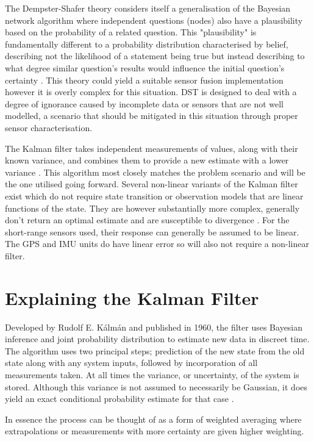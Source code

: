 	The Dempster-Shafer theory considers itself a generalisation of the Bayesian network algorithm where independent questions (nodes) also have a plausibility based on the probability of a related question. This "plausibility" is fundamentally different to a probability distribution characterised by belief, describing not the likelihood of a statement being true but instead describing to what degree similar question's results would influence the initial question's certainty \cite{shafer2002dempster}. This theory could yield a suitable sensor fusion implementation however it is overly complex for this situation. DST is designed to deal with a degree of ignorance caused by incomplete data or sensors that are not well modelled, a scenario that should be mitigated in this situation through proper sensor characterisation. \par
    The Kalman filter takes independent measurements of values, along with their known variance, and combines them to provide a new estimate with a lower variance \cite{kalman1960new}. This algorithm most closely matches the problem scenario and will be the one utilised going forward. Several non-linear variants of the Kalman filter exist which do not require state transition or observation models that are linear functions of the state. They are however substantially more complex, generally don't return an optimal estimate and are susceptible to divergence \cite{lefebvre2004kalman}. For the short-range sensors used, their response can generally be assumed to be linear. The GPS and IMU units do have linear error so will also not require a non-linear filter.
    
\section{Explaining the Kalman Filter}
\label{sec:kalmanfilterbasics}
Developed by Rudolf E. K\'{a}lm\'{a}n and published in 1960, the filter uses Bayesian inference and joint probability distribution to estimate new data in discreet time. The algorithm uses two principal steps; prediction of the new state from the old state along with any system inputs, followed by incorporation of all measurements taken. At all times the variance, or uncertainty, of the system is stored. Although this variance is not assumed to necessarily be Gaussian, it does yield an exact conditional probability estimate for that case \cite{kalman1960new}. \par
	In essence the process can be thought of as a form of weighted averaging where extrapolations or measurements with more certainty are given higher weighting. 

